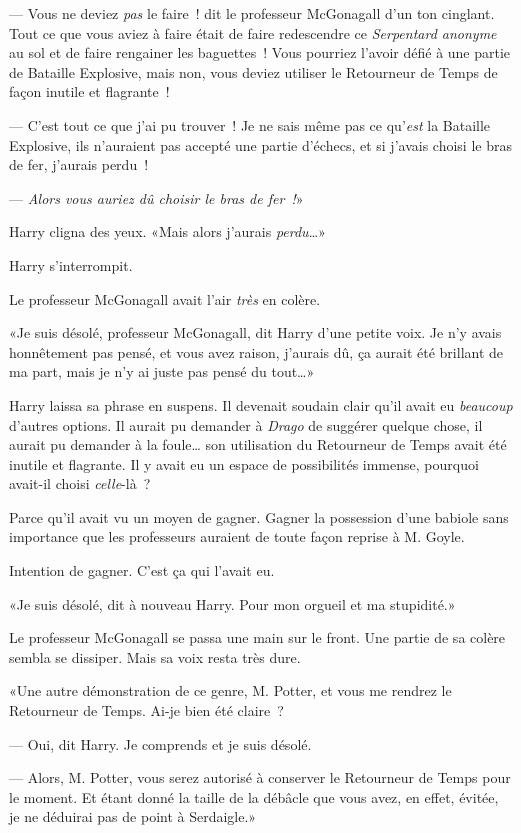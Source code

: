 --- Vous ne deviez \emph{pas} le faire~! dit le professeur McGonagall d'un ton cinglant. Tout ce que vous aviez à faire était de faire redescendre ce \emph{Serpentard anonyme} au sol et de faire rengainer les baguettes~! Vous pourriez l'avoir défié à une partie de Bataille Explosive, mais non, vous deviez utiliser le Retourneur de Temps de façon inutile et flagrante~!

--- C'est tout ce que j'ai pu trouver~! Je ne sais même pas ce qu'\emph{est} la Bataille Explosive, ils n'auraient pas accepté une partie d'échecs, et si j'avais choisi le bras de fer, j'aurais perdu~!

--- \emph{Alors vous auriez dû choisir le bras de fer~!}»

Harry cligna des yeux. «Mais alors j'aurais \emph{perdu}…»

Harry s'interrompit.

Le professeur McGonagall avait l'air \emph{très} en colère.

«Je suis désolé, professeur McGonagall, dit Harry d'une petite voix. Je n'y avais honnêtement pas pensé, et vous avez raison, j'aurais dû, ça aurait été brillant de ma part, mais je n'y ai juste pas pensé du tout…»

Harry laissa sa phrase en suspens. Il devenait soudain clair qu'il avait eu \emph{beaucoup} d'autres options. Il aurait pu demander à \emph{Drago} de suggérer quelque chose, il aurait pu demander à la foule… son utilisation du Retourneur de Temps avait été inutile et flagrante. Il y avait eu un espace de possibilités immense, pourquoi avait-il choisi \emph{celle}-là~?

Parce qu'il avait vu un moyen de gagner. Gagner la possession d'une babiole sans importance que les professeurs auraient de toute façon reprise à M. Goyle.

Intention de gagner. C'est ça qui l'avait eu.

«Je suis désolé, dit à nouveau Harry. Pour mon orgueil et ma stupidité.»

Le professeur McGonagall se passa une main sur le front. Une partie de sa colère sembla se dissiper. Mais sa voix resta très dure.

«Une autre démonstration de ce genre, M. Potter, et vous me rendrez le Retourneur de Temps. Ai-je bien été claire~?

--- Oui, dit Harry. Je comprends et je suis désolé.

--- Alors, M. Potter, vous serez autorisé à conserver le Retourneur de Temps pour le moment. Et étant donné la taille de la débâcle que vous avez, en effet, évitée, je ne déduirai pas de point à Serdaigle.»

